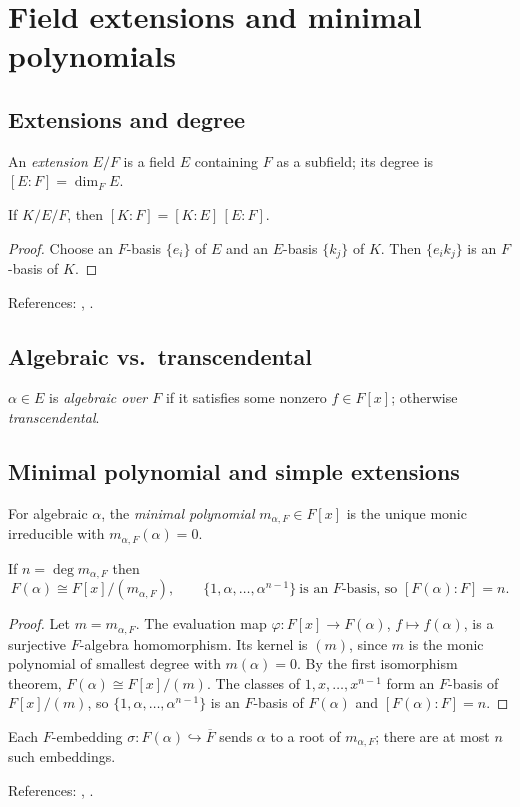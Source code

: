 \section{Field extensions and minimal polynomials}\label{sec:extensions-minimal}

\subsection{Extensions and degree}
\begin{definition}
An \emph{extension} $E/F$ is a field $E$ containing $F$ as a subfield; its degree is $[E\!:\!F]=\dim_F E$.
\end{definition}
\begin{theorem}\label{thm:tower}
If $K/E/F$, then $[K\!:\!F]=[K\!:\!E]\,[E\!:\!F]$.
\end{theorem}
\begin{proof}
Choose an $F$-basis $\{e_i\}$ of $E$ and an $E$-basis $\{k_j\}$ of $K$. Then $\{e_i k_j\}$ is an $F$-basis of $K$.
\end{proof}
References: \cite[\S13]{DF}, \cite[Ch.~V]{Artin}.

\subsection{Algebraic vs.\ transcendental}
\begin{definition}
$\alpha\in E$ is \emph{algebraic over $F$} if it satisfies some nonzero $f\in F[x]$; otherwise \emph{transcendental}.
\end{definition}

\subsection{Minimal polynomial and simple extensions}
\begin{definition}
For algebraic $\alpha$, the \emph{minimal polynomial} $m_{\alpha,F}\in F[x]$ is the unique monic irreducible with $m_{\alpha,F}(\alpha)=0$.
\end{definition}
\begin{proposition}[Structure]\label{prop:simple}
If $n=\deg m_{\alpha,F}$ then
\[
F(\alpha)\cong F[x]/(m_{\alpha,F}),\qquad
\{1,\alpha,\dots,\alpha^{n-1}\}\ \text{is an $F$-basis, so } [F(\alpha)\!:\!F]=n.
\]
\end{proposition}
\begin{proof}
Let $m=m_{\alpha,F}$. The evaluation map $\varphi:F[x]\to F(\alpha)$, $f\mapsto f(\alpha)$, is a surjective $F$-algebra homomorphism. Its kernel is $(m)$, since $m$ is the monic polynomial of smallest degree with $m(\alpha)=0$. By the first isomorphism theorem, $F(\alpha)\cong F[x]/(m)$. The classes of $1,x,\dots,x^{n-1}$ form an $F$-basis of $F[x]/(m)$, so $\{1,\alpha,\dots,\alpha^{n-1}\}$ is an $F$-basis of $F(\alpha)$ and $[F(\alpha)\!:\!F]=n$.
\end{proof}
\begin{remark}[Conjugates]
Each $F$-embedding $\sigma:F(\alpha)\hookrightarrow \overline{F}$ sends $\alpha$ to a root of $m_{\alpha,F}$; there are at most $n$ such embeddings.
\end{remark}
References: \cite[\S13--14]{DF}, \cite[Ch.~V]{Artin}.

